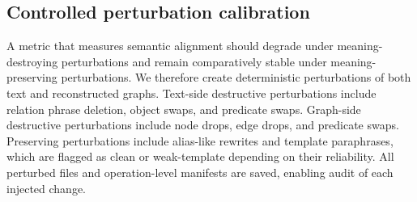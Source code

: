 \subsection{Controlled perturbation calibration}
A metric that measures semantic alignment should degrade under meaning-destroying perturbations and remain comparatively stable under meaning-preserving perturbations. We therefore create deterministic perturbations of both text and reconstructed graphs. Text-side destructive perturbations include relation phrase deletion, object swaps, and predicate swaps. Graph-side destructive perturbations include node drops, edge drops, and predicate swaps. Preserving perturbations include alias-like rewrites and template paraphrases, which are flagged as clean or weak-template depending on their reliability. All perturbed files and operation-level manifests are saved, enabling audit of each injected change.
